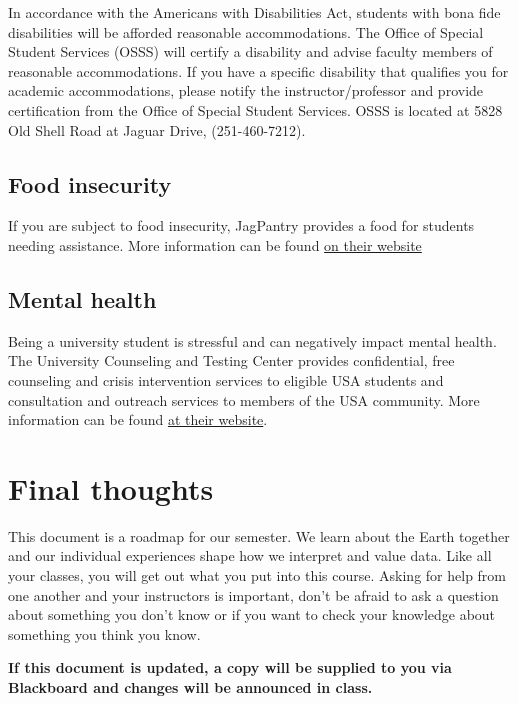 \documentclass[11pt,]{article}
\begin{document}
In accordance with the Americans with Disabilities Act, students with
bona fide disabilities will be afforded reasonable accommodations. The
Office of Special Student Services (OSSS) will certify a disability and
advise faculty members of reasonable accommodations. If you have a
specific disability that qualifies you for academic accommodations,
please notify the instructor/professor and provide certification from
the Office of Special Student Services. OSSS is located at 5828 Old
Shell Road at Jaguar Drive, (251-460-7212).

\hypertarget{food-insecurity}{%
\subsection{Food insecurity}\label{food-insecurity}}

If you are subject to food insecurity, JagPantry provides a food for
students needing assistance. More information can be found
\href{https://www.southalabama.edu/departments/sga/foodpantry.html}{on
their website}

\hypertarget{mental-health}{%
\subsection{Mental health}\label{mental-health}}

Being a university student is stressful and can negatively impact mental
health. The University Counseling and Testing Center provides
confidential, free counseling and crisis intervention services to
eligible USA students and consultation and outreach services to members
of the USA community. More information can be found
\href{https://www.southalabama.edu/departments/counseling/}{at their
website}.

\hypertarget{final-thoughts}{%
\section{Final thoughts}\label{final-thoughts}}

This document is a roadmap for our semester. We learn about the Earth
together and our individual experiences shape how we interpret and value
data. Like all your classes, you will get out what you put into this
course. Asking for help from one another and your instructors is
important, don't be afraid to ask a question about something you don't
know or if you want to check your knowledge about something you think
you know.

\textbf{If this document is updated, a copy will be supplied to you via
Blackboard and changes will be announced in class.}
\end{document}
